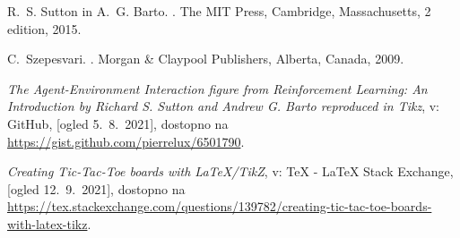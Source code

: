 \documentclass{beamer}    %
\begin{document}
\begin{frame}[t, allowframebreaks]
\begin{thebibliography}{10}
        R.~S. Sutton in A.~G. Barto.
        .
        \newblock The MIT Press, Cambridge, Massachusetts, 2 edition, 2015.
        
        C.~Szepesvari.
        .
        \newblock Morgan \& Claypool Publishers, Alberta, Canada, 2009.
    
        \emph{The Agent-Environment Interaction figure from Reinforcement Learning: An Introduction by Richard S. Sutton and Andrew G. Barto reproduced in Tikz}, v: GitHub, [ogled 5.~8.~2021], dostopno na \url{https://gist.github.com/pierrelux/6501790}.
    
        \emph{Creating Tic-Tac-Toe boards with LaTeX/TikZ}, v: TeX - LaTeX Stack Exchange, [ogled 12.~9.~2021], dostopno na \url{https://tex.stackexchange.com/questions/139782/creating-tic-tac-toe-boards-with-latex-tikz}.
    
        \end{thebibliography}
\end{frame}
\end{document}
